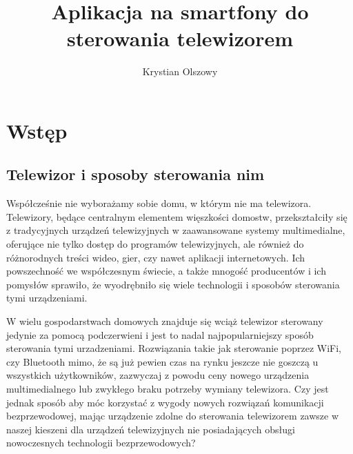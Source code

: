 \documentclass[12pt,twoside]{article}
\author{Krystian Olszowy}
\title{Aplikacja na smartfony do sterowania telewizorem}
\begin{document}
\maketitle

\blankpage

\tableofcontents

\clearpage
\blankpage

\section{Wstęp}
\subsection{Telewizor i sposoby sterowania nim}
{Współcześnie nie wyborażamy sobie domu, w którym nie ma telewizora. Telewizory, będące 
centralnym elementem więszkości domostw, przekształciły się z tradycyjnych urządzeń 
telewizyjnych w zaawansowane systemy multimedialne, oferujące nie tylko dostęp do programów telewizyjnych,
ale również do różnorodnych treści wideo, gier, czy nawet aplikacji internetowych. 
Ich powszechność we współczesnym świecie, a także mnogość producentów i ich pomysłów 
sprawiło, że wyodrębniło się wiele technologii i sposobów sterowania tymi urządzeniami.

W wielu gospodarstwach domowych znajduje się wciąż telewizor sterowany jedynie za pomocą podczerwieni i jest
 to nadal najpopularniejszy sposób sterowania tymi urzadzeniami. Rozwiązania takie jak sterowanie poprzez WiFi, czy Bluetooth
 mimo, że są już pewien czas na rynku jeszcze nie goszczą u wszystkich użytkowników, zazwyczaj z powodu ceny
 nowego urządzenia multimedialnego lub zwykłego braku potrzeby wymiany telewizora. Czy jest jednak sposób aby
móc korzystać z wygody nowych rozwiązań komunikacji bezprzewodowej, mając urządzenie zdolne do sterowania 
telewizorem zawsze w naszej kieszeni dla urządzeń telewizyjnych nie posiadających obsługi nowoczesnych technologii bezprzewodowych?
}
\end{document}
